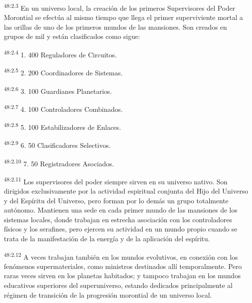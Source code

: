 \par
\textsuperscript{48:2.3} En un universo local, la creación de los primeros Supervisores del Poder Morontial se efectúa al mismo tiempo que llega el primer superviviente mortal a las orillas de uno de los primeros mundos de las mansiones. Son creados en grupos de mil y están clasificados como sigue:

\par
\textsuperscript{48:2.4} 1. 400 Reguladores de Circuitos.

\par
\textsuperscript{48:2.5} 2. 200 Coordinadores de Sistemas.

\par
\textsuperscript{48:2.6} 3. 100 Guardianes Planetarios.

\par
\textsuperscript{48:2.7} 4. 100 Controladores Combinados.

\par
\textsuperscript{48:2.8} 5. 100 Estabilizadores de Enlaces.

\par
\textsuperscript{48:2.9} 6. 50 Clasificadores Selectivos.

\par
\textsuperscript{48:2.10} 7. 50 Registradores Asociados.

\par
\textsuperscript{48:2.11} Los supervisores del poder siempre sirven en su universo nativo. Son dirigidos exclusivamente por la actividad espiritual conjunta del Hijo del Universo y del Espíritu del Universo, pero forman por lo demás un grupo totalmente autónomo. Mantienen una sede en cada primer mundo de las mansiones de los sistemas locales, donde trabajan en estrecha asociación con los controladores físicos y los serafines, pero ejercen su actividad en un mundo propio cuando se trata de la manifestación de la energía y de la aplicación del espíritu.

\par
\textsuperscript{48:2.12} A veces trabajan también en los mundos evolutivos, en conexión con los fenómenos supermateriales, como ministros destinados allí temporalmente. Pero raras veces sirven en los planetas habitados; y tampoco trabajan en los mundos educativos superiores del superuniverso, estando dedicados principalmente al régimen de transición de la progresión morontial de un universo local.

